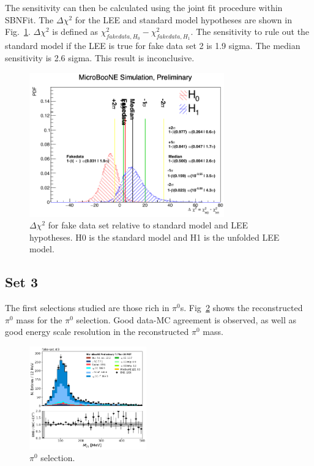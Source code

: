 The sensitivity can then be calculated using the joint fit procedure within SBNFit. The $\Delta \chi^{2}$ for the LEE and standard model hypotheses are shown in Fig.~\ref{fig:fakedata:set2:sens}.  $\Delta \chi^{2}$ is defined as $\chi^{2}_{fakedata, H_{0}}-\chi^{2}_{fakedata, H_{1}}$. The sensitivity to rule out the standard model if the LEE is true for fake data set 2 is 1.9 sigma.  The median sensitivity is 2.6 sigma. This result is inconclusive.

\begin{figure}[H]
\begin{center}
\includegraphics[width=0.75\textwidth]{Fakedata/set2/sens.pdf}
\caption{\label{fig:fakedata:set2:sens} $\Delta \chi^{2}$ for fake data set relative to standard model and LEE hypotheses. H0 is the standard model and H1 is the unfolded LEE model.}
\end{center}
\end{figure}


\subsection{Set 3}

The first selections studied are those rich in $\pi^{0}$s. Fig~\ref{fig:fakedata:set3:pi0} shows the reconstructed $\pi^{0}$ mass for the $\pi^{0}$ selection. Good data-MC agreement is observed, as well as good energy scale resolution in the reconstructed $\pi^{0}$ mass. 
\begin{figure}[H]
\begin{center}
\includegraphics[width=0.45\textwidth]{Fakedata/set3/pi0.pdf}
\caption{\label{fig:fakedata:set3:pi0} $\pi^{0}$ selection.}
\end{center}
\end{figure}

